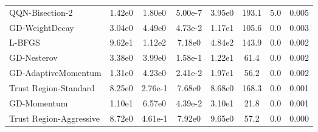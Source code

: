 \documentclass{article}
\begin{document}
\begin{table}[htbp]
{\begin{tabular}{p{2.5cm}*{7}{c}}
QQN-Bisection-2 & 1.42e0 & 1.80e0 & 5.00e-7 & 3.95e0 & 193.1 & 5.0 & 0.005 \\
GD-WeightDecay & 3.04e0 & 4.49e0 & 4.73e-2 & 1.17e1 & 105.6 & 0.0 & 0.003 \\
L-BFGS & 9.62e1 & 1.12e2 & 7.18e0 & 4.84e2 & 143.9 & 0.0 & 0.002 \\
GD-Nesterov & 3.38e0 & 3.99e0 & 1.58e-1 & 1.22e1 & 61.4 & 0.0 & 0.002 \\
GD-AdaptiveMomentum & 1.31e0 & 4.23e0 & 2.41e-2 & 1.97e1 & 56.2 & 0.0 & 0.002 \\
Trust Region-Standard & 8.25e0 & 2.76e-1 & 7.68e0 & 8.68e0 & 168.3 & 0.0 & 0.001 \\
GD-Momentum & 1.10e1 & 6.57e0 & 4.39e-2 & 3.10e1 & 21.8 & 0.0 & 0.001 \\
Trust Region-Aggressive & 8.72e0 & 4.61e-1 & 7.92e0 & 9.65e0 & 57.2 & 0.0 & 0.000 \\
\bottomrule
\end{tabular}
}
\end{table}
\end{document}
